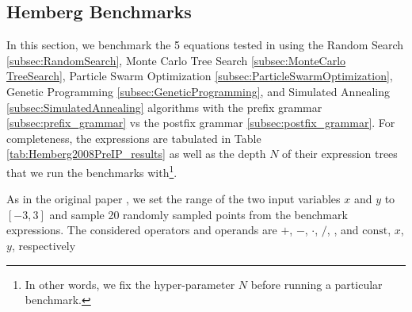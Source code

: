 \documentclass[12pt]{iopart}
\newcommand\specialcaret{%
  \stackengine{0pt}{\ \,}{\scalebox{1.1}[2]{\raisebox{-0.9ex}{\string^}}}{O}{c}{F}{T}{L}}
\begin{document}
\subsection{Hemberg Benchmarks} \label{subsec:HembergBenchmarks}
In this section, we benchmark the 5 equations tested in \cite{hemberg2008pre} using the Random Search \ref{subsec:RandomSearch}, Monte Carlo Tree Search \ref{subsec:MonteCarlo TreeSearch}, Particle Swarm Optimization \ref{subsec:ParticleSwarmOptimization}, Genetic Programming \ref{subsec:GeneticProgramming}, and Simulated Annealing \ref{subsec:SimulatedAnnealing} algorithms with the prefix grammar \ref{subsec:prefix_grammar} vs the postfix grammar \ref{subsec:postfix_grammar}. For completeness, the expressions are tabulated in Table \ref{tab:Hemberg2008PreIP_results} as well as the depth $N$ of their expression trees that we run the benchmarks with\footnote{In other words, we fix the hyper-parameter $N$ before running a particular benchmark.}.
\par As in the original paper \cite{hemberg2008pre}, we set the range of the two input variables $x$ and $y$ to $[-3,3]$ and sample 20 randomly sampled points from the benchmark expressions.  The considered operators and operands are $+$, $-$, $\cdot$, $/$, \specialcaret , and $\mathrm{const}$, $x$, $y$, respectively

\begin{table}[]
    \centering
    \caption{Expressions from \cite{hemberg2008pre} considered in section \ref{subsec:HembergBenchmarks}.}
    \label{tab:Hemberg2008PreIP_results}
\end{table}
\end{document}
